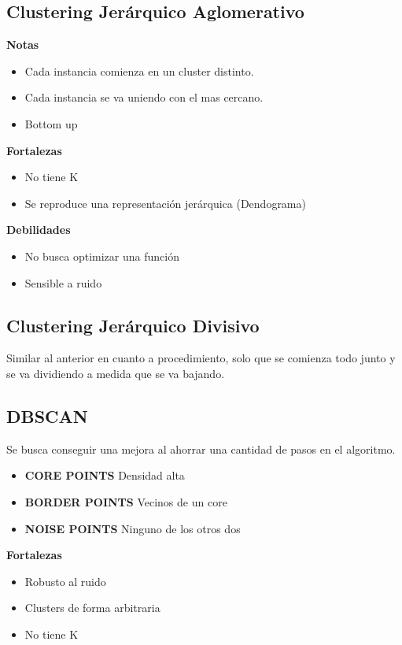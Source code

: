 \documentclass[titlepage,a4paper]{article}
\begin{document}
\subsection{Clustering Jerárquico Aglomerativo}
\textbf{Notas}
\begin{itemize}
    \item Cada instancia comienza en un cluster distinto.
    \item Cada instancia se va uniendo con el mas cercano.
    \item Bottom up
\end{itemize}

\textbf{Fortalezas}
\begin{itemize}
    \item No tiene K
    \item Se reproduce una representación jerárquica (Dendograma)
\end{itemize}

\textbf{Debilidades}
\begin{itemize}
    \item No busca optimizar una función
    \item Sensible a ruido
\end{itemize}

\subsection{Clustering Jerárquico Divisivo}
Similar al anterior en cuanto a procedimiento, solo que se comienza todo junto y se va dividiendo a medida que se va bajando.

\subsection{DBSCAN}
Se busca conseguir una mejora al ahorrar una cantidad de pasos en el algoritmo.

\begin{itemize}
    \item \textbf{CORE POINTS} Densidad alta
    \item \textbf{BORDER POINTS} Vecinos de un core
    \item \textbf{NOISE POINTS} Ninguno de los otros dos
\end{itemize}

\textbf{Fortalezas}
\begin{itemize}
    \item Robusto al ruido
    \item Clusters de forma arbitraria
    \item No tiene K
\end{itemize}
\end{document}
